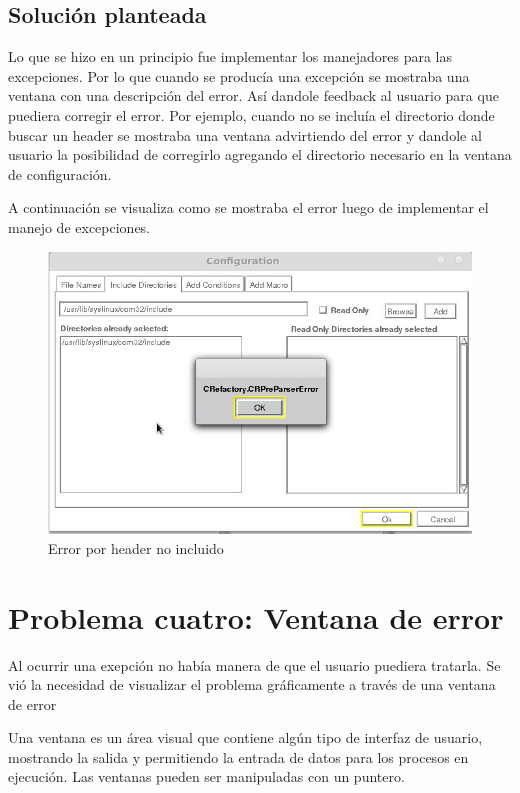\documentclass[a4paper,oneside,10pt]{article}
\begin{document}
\subsection{Soluci\'on planteada}
Lo que se hizo en un principio fue implementar los manejadores para las excepciones. Por lo que cuando se produc\'ia una excepci\'on se mostraba una ventana con una descripci\'on del error. As\'i dandole feedback al usuario para que puediera corregir el error. Por ejemplo, cuando no se inclu\'ia el directorio donde buscar un header se mostraba una ventana advirtiendo del error y dandole al usuario la posibilidad de corregirlo agregando el directorio necesario en la ventana de configuraci\'on.

A continuaci\'on se visualiza como se mostraba el error luego de implementar el manejo de excepciones.

\begin{figure}[h!]
  \centering
    \includegraphics[scale=0.50]{images/codigo_modificado/error_header_no_encontrado_sin_view_error.jpg}
     \caption{Error por header no incluido}
\end{figure}

\section{Problema cuatro: Ventana de error}

Al ocurrir una exepci\'on no hab\'ia manera de que el usuario puediera tratarla. Se vi\'o la necesidad de visualizar el problema gr\'aficamente a trav\'es de una ventana de error

Una ventana es un \'area visual que contiene alg\'un tipo de interfaz de usuario, mostrando la salida y permitiendo la entrada de datos para los procesos en ejecuci\'on. Las ventanas pueden ser manipuladas con un puntero.
\end{document}
